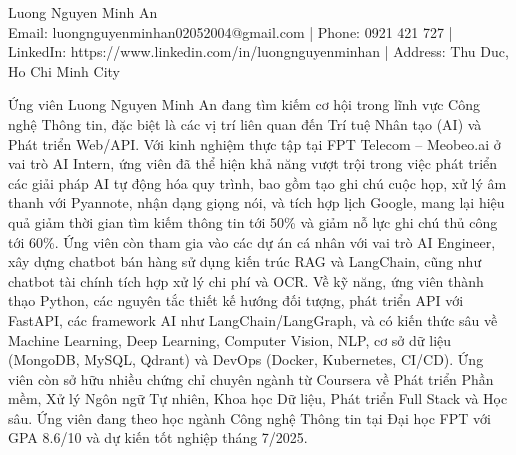 \documentclass[letterpaper, 11pt]{article}
\newcommand{\sectiontitle}[1]{\vspace{0.1in}\noindent{\Large\color{primary} #1}\vspace{0.05in}\hrulefill}
\begin{document}
\pagestyle{empty} %

\begin{center}
    {\Huge \color{primary} Luong Nguyen Minh An} \\
    \vspace{0.05in}
    \small
    \color{text}
    Email: luongnguyenminhan02052004@gmail.com | Phone: 0921 421 727 | LinkedIn: https://www.linkedin.com/in/luongnguyenminhan | Address: Thu Duc, Ho Chi Minh City
\end{center}

\sectiontitle{Summary}
Ứng viên Luong Nguyen Minh An đang tìm kiếm cơ hội trong lĩnh vực Công nghệ Thông tin, đặc biệt là các vị trí liên quan đến Trí tuệ Nhân tạo (AI) và Phát triển Web/API. Với kinh nghiệm thực tập tại FPT Telecom – Meobeo.ai ở vai trò AI Intern, ứng viên đã thể hiện khả năng vượt trội trong việc phát triển các giải pháp AI tự động hóa quy trình, bao gồm tạo ghi chú cuộc họp, xử lý âm thanh với Pyannote, nhận dạng giọng nói, và tích hợp lịch Google, mang lại hiệu quả giảm thời gian tìm kiếm thông tin tới 50\% và giảm nỗ lực ghi chú thủ công tới 60\%. Ứng viên còn tham gia vào các dự án cá nhân với vai trò AI Engineer, xây dựng chatbot bán hàng sử dụng kiến trúc RAG và LangChain, cũng như chatbot tài chính tích hợp xử lý chi phí và OCR. Về kỹ năng, ứng viên thành thạo Python, các nguyên tắc thiết kế hướng đối tượng, phát triển API với FastAPI, các framework AI như LangChain/LangGraph, và có kiến thức sâu về Machine Learning, Deep Learning, Computer Vision, NLP, cơ sở dữ liệu (MongoDB, MySQL, Qdrant) và DevOps (Docker, Kubernetes, CI/CD). Ứng viên còn sở hữu nhiều chứng chỉ chuyên ngành từ Coursera về Phát triển Phần mềm, Xử lý Ngôn ngữ Tự nhiên, Khoa học Dữ liệu, Phát triển Full Stack và Học sâu. Ứng viên đang theo học ngành Công nghệ Thông tin tại Đại học FPT với GPA 8.6/10 và dự kiến tốt nghiệp tháng 7/2025.
\end{document}
